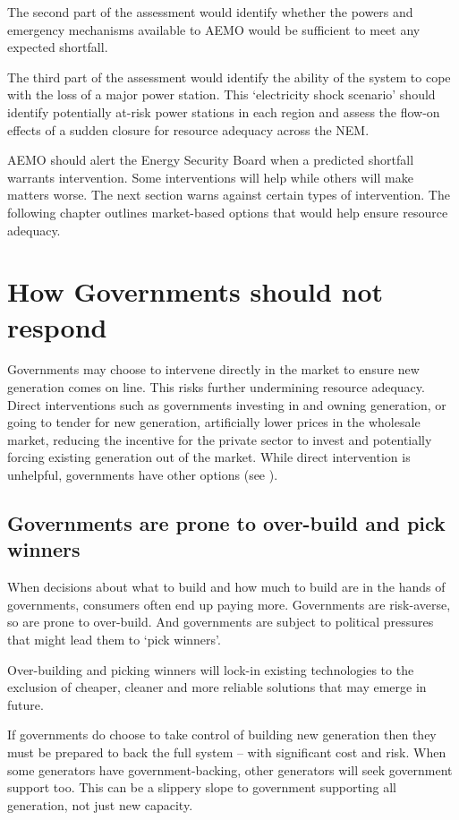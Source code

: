 \documentclass[FrontPage]{grattan}
\begin{document}
The second part of the assessment would identify whether the powers and emergency mechanisms available to AEMO would be sufficient to meet any expected shortfall. 

The third part of the assessment would identify the ability of the system to cope with the loss of a major power station. This `electricity shock scenario' should identify potentially at-risk power stations in each region and assess the flow-on effects of a sudden closure for resource adequacy across the NEM\@.

AEMO should alert the Energy Security Board when a predicted shortfall warrants intervention. Some interventions will help while others will make matters worse. The next section warns against certain types of intervention. The following chapter outlines market-based options that would help ensure resource adequacy. 


\section{How Governments should not respond}\label{sec:how-governments-should-not-respond}
Governments may choose to intervene directly in the market to ensure new generation comes on line. This risks further undermining resource adequacy. Direct interventions such as governments investing in and owning generation, or going to tender for new generation, artificially lower prices in the wholesale market, reducing the incentive for the private sector to invest and potentially forcing existing generation out of the market. While direct intervention is unhelpful, governments have other options (see ).

\subsection{Governments are prone to over-build and pick winners}\label{subsec:governments-prone-to-over-build-and-pick-winners}
When decisions about what to build and how much to build are in the hands of governments, consumers often end up paying more. Governments are risk-averse, so are prone to over-build. And governments are subject to political pressures that might lead them to `pick winners'. 

Over-building and picking winners will lock-in existing technologies to the exclusion of cheaper, cleaner and more reliable solutions that may emerge in future. 

If governments do choose to take control of building new generation then they must be prepared to back the full system -- with significant cost and risk. When some generators have government-backing, other generators will seek government support too. This can be a slippery slope to government supporting all generation, not just new capacity.
\end{document}
